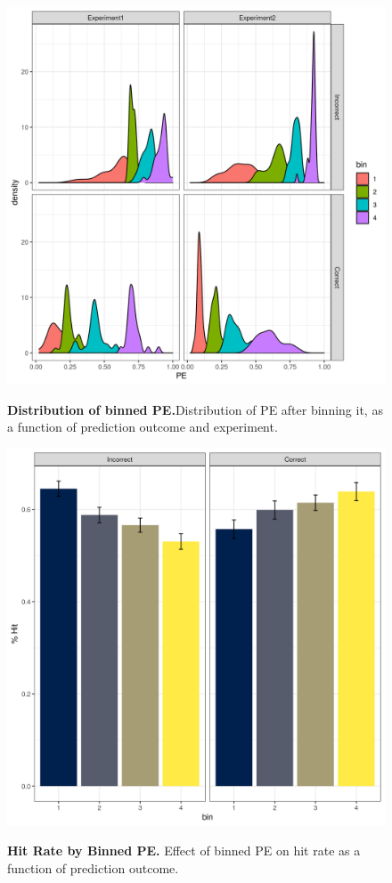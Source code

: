 \documentclass[a4paper,12pt]{article}
\begin{document}
\begin{figure}[ht!]
{\includegraphics[width=1\textwidth]{figures/PEdistr_binned.png}}
\caption{\textbf{Distribution of binned PE.}Distribution of PE after binning it, as a function of prediction outcome and experiment. }
\label{fig:PEbin_distr}

\end{figure}

\begin{figure}[ht!]
{\includegraphics[width=1\textwidth]{figures/binnedPE_mem.png}}
\caption{\textbf{Hit Rate by Binned PE.} Effect of binned PE on hit rate as a function of prediction outcome. }
\label{fig:PEbin_mem}

\end{figure}
\end{document}
